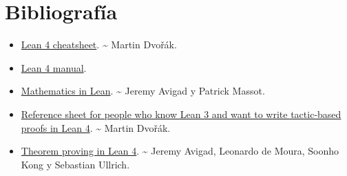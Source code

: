 \chapter{Bibliografía}
\label{sec:org9e25e2d}

\begin{itemize}
\item \href{https://raw.githubusercontent.com/madvorak/lean4-cheatsheet/main/lean-tactics.pdf}{Lean 4 cheatsheet}. \textasciitilde{} Martin Dvořák.
\item \href{https://leanprover.github.io/lean4/doc/whatIsLean.html}{Lean 4 manual}.
\item \href{https://leanprover-community.github.io/mathematics\_in\_lean/mathematics\_in\_lean.pdf}{Mathematics in Lean}. \textasciitilde{} Jeremy Avigad y Patrick Massot.
\item \href{https://github.com/madvorak/lean3-tactic-lean4/blob/main/README.md}{Reference sheet for people who know Lean 3 and want to write tactic-based proofs in Lean 4}. \textasciitilde{} Martin Dvořák.
\item \href{https://leanprover.github.io/theorem\_proving\_in\_lean4/title\_page.html}{Theorem proving in Lean 4}. \textasciitilde{} Jeremy Avigad, Leonardo de Moura, Soonho
Kong y Sebastian Ullrich.
\end{itemize}


